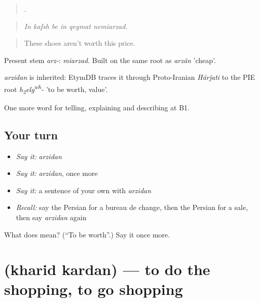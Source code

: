\begin{quote}
     .
\end{quote}

\begin{quote}
\emph{In kafsh be in qeymat nemiarzad.}
\end{quote}

\begin{quote}
These shoes aren't worth this price.
\end{quote}

Present stem \emph{arz-}: \emph{miarzad}. Built on the same root as \emph{arzân} 'cheap'.

\begin{cousinweb}
\emph{arzidan} is inherited: EtymDB traces it through Proto-Iranian \emph{Hárǰati} to the PIE root \emph{h\textsubscript{2}elg\textsuperscript{w}\textsuperscript{h}-} 'to be worth, value'.
\end{cousinweb}

\begin{grammarlens}[title={What you've built}]
One more word for telling, explaining and describing at B1.
\end{grammarlens}

\subsection*{Your turn}
\begin{itemize}
\raggedright
  \item \emph{Say it:} \emph{arzidan}
  \item \emph{Say it:} \emph{arzidan}, once more
  \item \emph{Say it:} a sentence of your own with \emph{arzidan}
  \item \emph{Recall:} say the Persian for a bureau de change, then the Persian for a sale, then say \emph{arzidan} again
\end{itemize}

\begin{tcolorbox}[breakable,colback=teal!4,colframe=teal!35!black,title={Before you move on}]
What does  mean? (\textquotedblleft{}To be worth\textquotedblright{}.) Say it once more.
\end{tcolorbox}
\section[\texorpdfstring{\fa{خرید} \fa{کردن} (kharid kardan)}{خرید کردن (kharid kardan)}]{  (kharid kardan) — to do the shopping, to go shopping}

